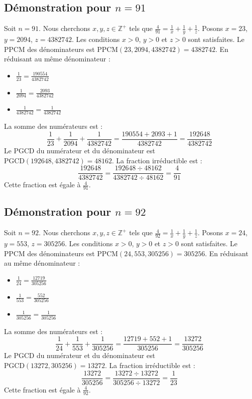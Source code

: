 \documentclass[11pt,a4paper]{article}
\begin{document}
\subsection{Démonstration pour $n = 91$}
Soit $n = 91$. Nous cherchons $x, y, z \in \mathbb{Z}^{+}$ tels que $\frac{4}{91} = \frac{1}{x} + \frac{1}{y} + \frac{1}{z}$.
Posons $x = 23$, $y = 2094$, $z = 4382742$.
Les conditions $x > 0$, $y > 0$ et $z > 0$ sont satisfaites.
Le PPCM des dénominateurs est $\text{PPCM}(23, 2094, 4382742) = 4382742$.
En réduisant au même dénominateur :
\begin{itemize}
    \item $\frac{1}{23} = \frac{190554}{4382742}$
    \item $\frac{1}{2094} = \frac{2093}{4382742}$
    \item $\frac{1}{4382742} = \frac{1}{4382742}$
\end{itemize}
La somme des numérateurs est :
$$ \frac{1}{23} + \frac{1}{2094} + \frac{1}{4382742} = \frac{190554 + 2093 + 1}{4382742} = \frac{192648}{4382742} $$
Le PGCD du numérateur et du dénominateur est $\text{PGCD}(192648, 4382742) = 48162$.
La fraction irréductible est :
$$ \frac{192648}{4382742} = \frac{192648 \div 48162}{4382742 \div 48162} = \frac{4}{91} $$
Cette fraction est égale à $\frac{4}{91}$.

\subsection{Démonstration pour $n = 92$}
Soit $n = 92$. Nous cherchons $x, y, z \in \mathbb{Z}^{+}$ tels que $\frac{4}{92} = \frac{1}{x} + \frac{1}{y} + \frac{1}{z}$.
Posons $x = 24$, $y = 553$, $z = 305256$.
Les conditions $x > 0$, $y > 0$ et $z > 0$ sont satisfaites.
Le PPCM des dénominateurs est $\text{PPCM}(24, 553, 305256) = 305256$.
En réduisant au même dénominateur :
\begin{itemize}
    \item $\frac{1}{24} = \frac{12719}{305256}$
    \item $\frac{1}{553} = \frac{552}{305256}$
    \item $\frac{1}{305256} = \frac{1}{305256}$
\end{itemize}
La somme des numérateurs est :
$$ \frac{1}{24} + \frac{1}{553} + \frac{1}{305256} = \frac{12719 + 552 + 1}{305256} = \frac{13272}{305256} $$
Le PGCD du numérateur et du dénominateur est $\text{PGCD}(13272, 305256) = 13272$.
La fraction irréductible est :
$$ \frac{13272}{305256} = \frac{13272 \div 13272}{305256 \div 13272} = \frac{1}{23} $$
Cette fraction est égale à $\frac{4}{92}$.
\end{document}
